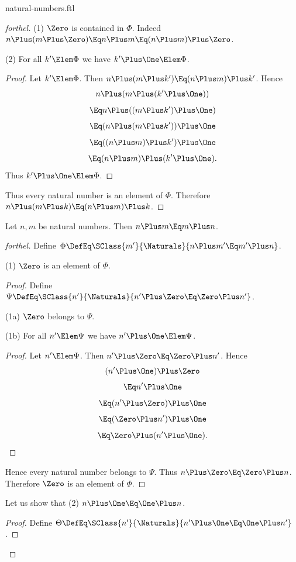 \documentclass{stex}
\begin{document}
\begin{smodule}{natural-numbers.ftl}
\begin{proof}[forthel]
  (1) $\Zero$ is contained in $\Phi$.
  Indeed $n \Plus (m \Plus \Zero) \Eq n \Plus m \Eq (n \Plus m) \Plus \Zero$.

  (2) For all $k' \Elem \Phi$ we have $k' \Plus \One \Elem \Phi$.
  \begin{proof}
    Let $k' \Elem \Phi$.
    Then $n \Plus (m \Plus k') \Eq (n \Plus m) \Plus k'$.
    Hence
    \[  n \Plus (m \Plus (k' \Plus \One))        \]
    \[    \Eq n \Plus ((m \Plus k') \Plus \One)    \]
    \[    \Eq (n \Plus (m \Plus k')) \Plus \One    \]
    \[    \Eq ((n \Plus m) \Plus k') \Plus \One    \]
    \[    \Eq (n \Plus m) \Plus (k' \Plus \One).   \]
    Thus $k' \Plus \One \Elem \Phi$.
  \end{proof}

  Thus every natural number is an element of $\Phi$.
  Therefore $n \Plus (m \Plus k) \Eq (n \Plus m) \Plus k$.
\end{proof}

\begin{proposition*}[forthel]
  Let $n, m$ be natural numbers.
  Then $n \Plus m \Eq m \Plus n$.
\end{proposition*}
\begin{proof}[forthel]
  Define $\Phi \DefEq \SClass{m'}{\Naturals}{n \Plus m' \Eq m' \Plus n}$.

  (1) $\Zero$ is an element of $\Phi$.
  \begin{proof}
    Define $\Psi \DefEq \SClass{n'}{\Naturals}{n' \Plus \Zero \Eq \Zero \Plus n'}$.

    (1a) $\Zero$ belongs to $\Psi$.

    (1b) For all $n' \Elem \Psi$ we have $n' \Plus \One \Elem \Psi$.
    \begin{proof}
      Let $n' \Elem \Psi$.
      Then $n' \Plus \Zero \Eq \Zero \Plus n'$.
      Hence
      \[  (n' \Plus \One) \Plus \Zero        \]
      \[    \Eq n' \Plus \One          \]
      \[    \Eq (n' \Plus \Zero) \Plus \One    \]
      \[    \Eq (\Zero \Plus n') \Plus \One    \]
      \[    \Eq \Zero \Plus (n' \Plus \One).   \]
    \end{proof}

    Hence every natural number belongs to $\Psi$.
    Thus $n \Plus \Zero \Eq \Zero \Plus n$.
    Therefore $\Zero$ is an element of $\Phi$.
  \end{proof}

  Let us show that (2) $n \Plus \One \Eq \One \Plus n$.
  \begin{proof}
    Define $\Theta \DefEq \SClass{n'}{\Naturals}{n' \Plus \One \Eq \One \Plus n'}$.


\end{proof}
\end{proof}
\end{smodule}
\end{document}
